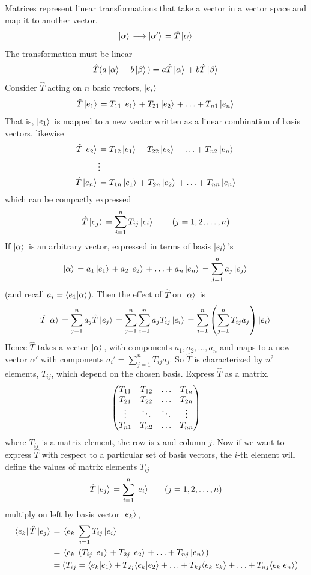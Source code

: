 \documentclass[english, 11pt]{article}
\begin{document}
        Matrices represent linear transformations that take a vector in a vector space and map it to another vector.
        \[ \left| \alpha \rangle \right. \longrightarrow \left| \alpha' \rangle \right.= \hat{T} \left| \alpha \rangle \right. \]
        The transformation must be linear
        \[ \hat{T}(a \left| \alpha \rangle \right. + b \left| \beta \rangle \right.) = a\hat{T}\left| \alpha \rangle \right. + b \hat{T}\left| \beta \rangle \right. \]
        Consider $\hat{T}$ acting on $n$ basic vectors, $\left| e_i \rangle \right.$
        \[ \hat{T} \left| e_1 \rangle \right. = T_{11}\left| e_1 \rangle \right. + T_{21}\left| e_2 \rangle \right. + \ldots + T_{n1} \left| e_n \rangle \right. \]
        That is, $\left| e_1 \rangle \right.$ is mapped to a new vector written as a linear combination of basis vectors, likewise
        \begin{align*}
          \hat{T} \left| e_2 \rangle \right. & = T_{12}\left| e_1 \rangle \right. + T_{22}\left| e_2 \rangle \right. + \ldots + T_{n2} \left| e_n \rangle \right. \\
          & \vdots \\
          \hat{T} \left| e_n \rangle \right. & = T_{1n} \left| e_1 \rangle \right. + T_{2n} \left| e_2 \rangle \right. + \ldots + T_{nn} \left| e_n \rangle \right.
        \end{align*}
        which can be compactly expressed
        \[ \hat{T}\ket{e_j} = \sum_{i=1}^nT_{ij} \ket{e_i} \ \ \ \ \ \ (j = 1,2,\ldots,n) \]
        If $\left| \alpha \rangle \right.$ is an arbitrary vector, expressed in terms of basis $\left| e_i \rangle \right.$'s
        \[ \left| \alpha \rangle \right. = a_1\left| e_1 \rangle \right. + a_2\left| e_2 \rangle \right. + \ldots + a_n\left| e_n \rangle \right. = \sum_{j=1}^n a_j\left| e_j \rangle \right. \]
        (and recall $a_i = \langle e_1 | \alpha \rangle$). Then the effect of $\hat{T}$ on $\left| \alpha \rangle \right.$ is
        \[ \hat{T}\left| \alpha \rangle \right. = \sum_{j=1}^n a_j \hat{T} \left| e_j \rangle \right. = \sum_{j=1}^n \sum_{i=1}^n a_j T_{ij} \left| e_i \rangle \right. = \sum_{i=1}^n \left( \sum_{j=1}^n T_{ij}a_j \right) \left| e_i \rangle \right. \]
        Hence $\hat{T}$ takes a vector $\left| \alpha \rangle \right.$, with components $a_1, a_2, \ldots, a_n$ and maps to a new vector $\alpha'$ with components $a_i' = \sum_{j=1}^n T_{ij} a_j$. So $\hat{T}$ is characterized by $n^2$ elements, $T_{ij}$, which depend on the chosen basis. Express $\hat{T}$ as a matrix.
        \[ \left(\begin{matrix}T_{11} & T_{12} & \hdots & T_{1n} \\ T_{21} & T_{22} & \hdots & T_{2n} \\ \vdots & \ddots & \ddots & \vdots \\ T_{n1} & T_{n2} & \hdots & T_{nn} \end{matrix}\right) \]
        where $T_{ij}$ is a matrix element, the row is $i$ and column $j$. Now if we want to express $\hat{T}$ with respect to a particular set of basis vectors, the $i$-th element will define the values of matrix elements $T_{ij}$
        \[ \hat{T}\ket{e_j} = \sum_{i=1}^n \ket{e_i} \ \ \ \ \ (j = 1,2,\ldots,n) \]
        multiply on left by basis vector $\left| e_k \rangle \right.$,
        \begin{align*}
          \left. \langle e_k \right|\hat{T}\left| e_j \rangle \right. & = \left. \langle e_k \right|\sum_{i = 1}T_{ij}\left| e_i \rangle \right. \\
          & = \left. \langle e_k \right| \left(T_{ij}\left| e_1 \rangle \right. + T_{2j}\left| e_2 \rangle \right. + \ldots + T_{nj} \left| e_n \rangle \right. \right) \\
          & = \left( T_{ij} = \langle e_k | e_1 \rangle + T_{2j}\langle e_k | e_2 \rangle + \ldots + T_{kj}\langle e_k | e_k \rangle + \ldots + T_{nj}\langle e_k | e_n \rangle \right)
        \end{align*}
\end{document}
